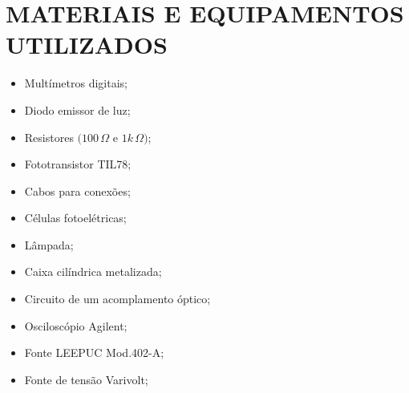 \section{MATERIAIS E EQUIPAMENTOS UTILIZADOS}

\begin{itemize}
    \item Multímetros digitais;
    \item Diodo emissor de luz;
    \item Resistores $(100 \,\Omega $ e $1k \,\Omega )$;
    \item Fototransistor TIL78;
    \item Cabos para conexões;
    \item Células fotoelétricas;
    \item Lâmpada;
    \item Caixa cilíndrica metalizada;
    \item Circuito de um acomplamento óptico;
    \item Osciloscópio Agilent;
    \item Fonte LEEPUC Mod.402-A;
    \item Fonte de tensão Varivolt;
\end{itemize}

\vspace{.25cm}